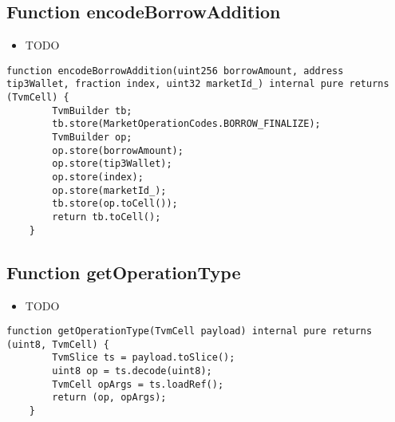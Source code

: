 \subsection{Function encodeBorrowAddition}

\noindent\begin{itemize}
\item TODO
\end{itemize}

\begin{lstlisting}[firstnumber=71]
    function encodeBorrowAddition(uint256 borrowAmount, address tip3Wallet, fraction index, uint32 marketId_) internal pure returns (TvmCell) {
        TvmBuilder tb;
        tb.store(MarketOperationCodes.BORROW_FINALIZE);
        TvmBuilder op;
        op.store(borrowAmount);
        op.store(tip3Wallet);
        op.store(index);
        op.store(marketId_);
        tb.store(op.toCell());
        return tb.toCell();
    }
\end{lstlisting}

\subsection{Function getOperationType}

\noindent\begin{itemize}
\item TODO
\end{itemize}

\begin{lstlisting}[firstnumber=41]
    function getOperationType(TvmCell payload) internal pure returns (uint8, TvmCell) {
        TvmSlice ts = payload.toSlice();
        uint8 op = ts.decode(uint8);
        TvmCell opArgs = ts.loadRef();
        return (op, opArgs);
    }
\end{lstlisting}
